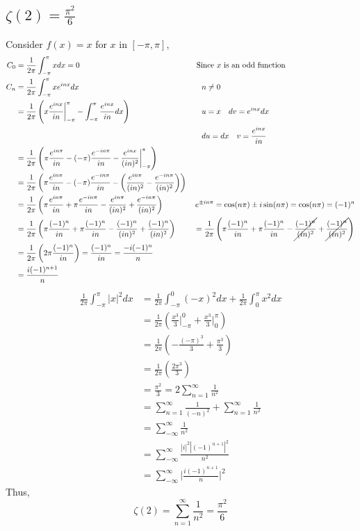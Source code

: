 \documentclass{article}
\begin{document}
\begin{center} \section*{$\zeta(2) = \frac{\pi^2}{6}$} \end{center}
Consider $f(x) = x$ for $x$ in $[-\pi,\pi]$,
\begin{alignat*}{2}
  C_0 &= \frac{1}{2\pi}\int_{-\pi}^\pi x dx = 0& &\text{ Since $x$ is
    an odd function}\\
  C_n &= \frac{1}{2\pi} \int_{-\pi}^\pi xe^{inx}dx &&\quad n \neq 0 \\
  &= \frac{1}{2\pi}\left( x\frac{e^{inx}}{in}\bigg|_{-\pi}^\pi
    -\int_{-\pi}^\pi\frac{e^{inx}}{in} dx \right) &&\quad u = x\quad dv = e^{inx}dx\\
  &&&\quad du = dx\quad v = \frac{e^{inx}}{in}\\
  &= \frac{1}{2\pi}\left( \pi\frac{e^{in\pi}}{in} - (-\pi)\frac{e^{-in\pi}}{in}
    -\frac{e^{inx}}{(in)^2}\bigg|_{-\pi}^\pi \right) &&\\
  &= \frac{1}{2\pi}\left( \pi\frac{e^{in\pi}}{in} - (-\pi)\frac{e^{-in\pi}}{in}
    -\left(  \frac{e^{in\pi}}{(in)^2}
      -\frac{e^{-in\pi}}{(in)^2}\right) \right) &&\\
  &= \frac{1}{2\pi}\left( \pi\frac{e^{in\pi}}{in} +\pi\frac{e^{-in\pi}}{in}
    -\frac{e^{in\pi}}{(in)^2}
      +\frac{e^{-in\pi}}{(in)^2} \right) &&\,e^{\pm in\pi}= \cos(n\pi)
    \pm i \sin(n\pi) = \cos(n\pi) = (-1)^n\\
  &= \frac{1}{2\pi}\left( \pi\frac{(-1)^n}{in} +\pi\frac{(-1)^n}{in}
    -\frac{(-1)^n}{(in)^2}
    +\frac{(-1)^n}{(in)^2} \right) &&= \frac{1}{2\pi}\left( \pi\frac{(-1)^n}{in} +\pi\frac{(-1)^n}{in}
    -\cancel{\frac{(-1)^n}{(in)^2}}
    +\cancel{\frac{(-1)^n}{(in)^2}} \right)\\
  &= \frac{1}{2\pi}\left( 2\pi\frac{(-1)^n}{in}\right) =
  \frac{(-1)^n}{in} = \frac{-i(-1)^n}{n}&&\\
  &= \frac{i(-1)^{n+1}}{n}
\end{alignat*}
\begin{align*}
  \frac{1}{2\pi}\int_{-\pi}^\pi |x|^2 dx
  &=\frac{1}{2\pi}\int_{-\pi}^0 (-x)^2 dx +\frac{1}{2\pi}\int_{0}^\pi
    x^2 dx\\
  &= \frac{1}{2\pi}\left(  \frac{x^3}{3}\bigg|_{-\pi}^0 +
    \frac{x^3}{3}\bigg|_{0}^\pi \right)\\
  &=\frac{1}{2\pi}\left( -\frac{(-\pi)^3}{3} + \frac{\pi^3}{3}
    \right)  \\
  &= \frac{1}{2\pi}\left(\frac{2\pi^3}{3} \right)\\
  &= \frac{\pi^2}{3} = 2\sum_{n=1}^\infty \frac{1}{n^2}\\
  &= \sum_{n=1}^\infty \frac{1}{(-n)^2}+ \sum_{n=1}^\infty \frac{1}{n^2}\\
  &= \sum_{-\infty}^\infty \frac{1}{n^2}\\
  &= \sum_{-\infty}^\infty \frac{|i|^2|(-1)^{n+1}|^2}{n^2}\\
  &= \sum_{-\infty}^\infty \bigg|\frac{i(-1)^{n+1}}{n}\bigg|^2
\end{align*}
Thus, \[\zeta(2) = \sum_{n=1}^\infty \frac{1}{n^2} = \frac{\pi^2}{6}\]
\end{document}
